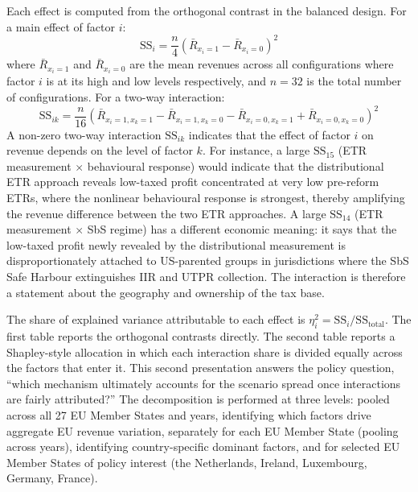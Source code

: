 \documentclass[11pt,a4paper]{article}
\begin{document}
Each effect is computed from the orthogonal contrast in the balanced design. For a main effect of factor $i$:
\begin{equation}\label{eq:main_effect}
\text{SS}_i = \frac{n}{4} \left(\bar{R}_{x_i = 1} - \bar{R}_{x_i = 0}\right)^2
\end{equation}
where $\bar{R}_{x_i = 1}$ and $\bar{R}_{x_i = 0}$ are the mean revenues across all configurations where factor $i$ is at its high and low levels respectively, and $n = 32$ is the total number of configurations. For a two-way interaction:
\begin{equation}\label{eq:interaction_effect}
\text{SS}_{ik} = \frac{n}{16} \left(\bar{R}_{x_i = 1, x_k = 1} - \bar{R}_{x_i = 1, x_k = 0} - \bar{R}_{x_i = 0, x_k = 1} + \bar{R}_{x_i = 0, x_k = 0}\right)^2
\end{equation}
A non-zero two-way interaction $\text{SS}_{ik}$ indicates that the effect of factor $i$ on revenue depends on the level of factor $k$. For instance, a large $\text{SS}_{15}$ (ETR measurement $\times$ behavioural response) would indicate that the distributional ETR approach reveals low-taxed profit concentrated at very low pre-reform ETRs, where the nonlinear behavioural response is strongest, thereby amplifying the revenue difference between the two ETR approaches. A large $\text{SS}_{14}$ (ETR measurement $\times$ SbS regime) has a different economic meaning: it says that the low-taxed profit newly revealed by the distributional measurement is disproportionately attached to US-parented groups in jurisdictions where the SbS Safe Harbour extinguishes IIR and UTPR collection. The interaction is therefore a statement about the geography and ownership of the tax base. 

The share of explained variance attributable to each effect is $\eta_i^2 = \text{SS}_i / \text{SS}_{\text{total}}$. The first table reports the orthogonal contrasts directly. The second table reports a Shapley-style allocation in which each interaction share is divided equally across the factors that enter it. This second presentation answers the policy question, ``which mechanism ultimately accounts for the scenario spread once interactions are fairly attributed?'' The decomposition is performed at three levels: pooled across all 27 EU Member States and years, identifying which factors drive aggregate EU revenue variation, separately for each EU Member State (pooling across years), identifying country-specific dominant factors, and for selected EU Member States of policy interest (the Netherlands, Ireland, Luxembourg, Germany, France).
\end{document}
